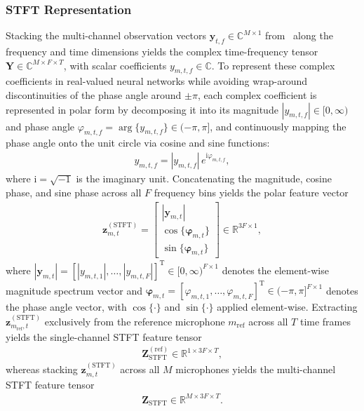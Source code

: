 \documentclass[lettersize,journal]{IEEEtran}
\begin{document}
\subsubsection{STFT Representation}
\label{sec:feat_stft}
Stacking the multi-channel observation vectors $\mathbf{y}_{t,f} \in \mathbb{C}^{M \times 1}$ from~ along the frequency and time dimensions yields the complex time-frequency tensor $\mathbf{Y} \in \mathbb{C}^{M \times F \times T}$, with scalar coefficients $y_{m,t,f} \in \mathbb{C}$. To represent these complex coefficients in real-valued neural networks while avoiding wrap-around discontinuities of the phase angle around $\pm\pi$, each complex coefficient is represented in polar form by decomposing it into its magnitude $|y_{m,t,f}| \in [0, \infty)$ and phase angle $\varphi_{m,t,f} = \arg\{y_{m,t,f}\} \in (-\pi, \pi]$, and continuously mapping the phase angle onto the unit circle via cosine and sine functions:
\begin{align}
  y_{m,t,f} = |y_{m,t,f}| \, e^{\mathrm{i} \varphi_{m,t,f}},
\end{align}
where $\mathrm{i} = \sqrt{-1}$ is the imaginary unit. Concatenating the magnitude, cosine phase, and sine phase across all $F$ frequency bins yields the polar feature vector
\begin{align}
  \mathbf{z}_{m,t}^{(\mathrm{STFT})} = \begin{bmatrix} |\mathbf{y}_{m,t}| \\ \cos\{\bm{\varphi}_{m,t}\} \\ \sin\{\bm{\varphi}_{m,t}\} \end{bmatrix} \in \mathbb{R}^{3F \times 1},
  \label{eq:feat_stft_vec}
\end{align}
where $|\mathbf{y}_{m,t}| = [|y_{m,t,1}|, \ldots, |y_{m,t,F}|]^{\mathrm{T}} \in [0, \infty)^{F \times 1}$ denotes the element-wise magnitude spectrum vector and $\bm{\varphi}_{m,t} = [\varphi_{m,t,1}, \ldots, \varphi_{m,t,F}]^{\mathrm{T}} \in (-\pi, \pi]^{F \times 1}$ denotes the phase angle vector, with $\cos\{\cdot\}$ and $\sin\{\cdot\}$ applied element-wise.
Extracting $\mathbf{z}_{m_{\mathrm{ref}},t}^{(\mathrm{STFT})}$ exclusively from the reference microphone $m_{\mathrm{ref}}$ across all $T$ time frames yields the single-channel \gls{STFT} feature tensor
\begin{align}
  \mathbf{Z}_{\mathrm{STFT}}^{(\mathrm{ref})} \in \mathbb{R}^{1 \times 3F \times T},
  \label{eq:feat_stft_ref_tensor}
\end{align}
whereas stacking $\mathbf{z}_{m,t}^{(\mathrm{STFT})}$ across all $M$ microphones yields the multi-channel \gls{STFT} feature tensor
\begin{align}
  \mathbf{Z}_{\mathrm{STFT}} \in \mathbb{R}^{M \times 3F \times T}.
  \label{eq:feat_stft_tensor}
\end{align}
\end{document}
